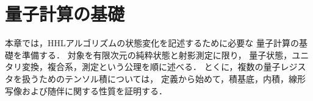 \chapter{量子計算の基礎}
\label{chap:quantum-basics}

本章では，HHLアルゴリズムの状態変化を記述するために必要な
量子計算の基礎を準備する\cite{shimada2020}．
対象を有限次元の純粋状態と射影測定に限り，
量子状態，ユニタリ変換，複合系，測定という公理を順に述べる．
とくに，複数の量子レジスタを扱うためのテンソル積については，
定義から始めて，積基底，内積，線形写像および随伴に関する性質を証明する．









